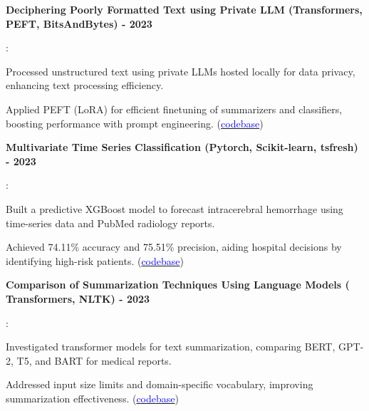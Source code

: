 \documentclass[letterpaper,10.5pt]{article}
\newcommand{\resumeItem}[2]{
  \item\small{
    \textbf{#1}{: #2 \vspace{-1pt}} %
  }
}
\newcommand{\resumeSubItem}[2]{\resumeItem{#1}{#2}\vspace{-1pt}} %
\begin{document}
    \resumeSubItem{Deciphering Poorly Formatted Text using Private LLM (Transformers, PEFT, BitsAndBytes) - 2023}{
\item \textbullet \quad Processed unstructured text using private LLMs hosted locally for data privacy, enhancing text processing efficiency. 

\textbullet \quad Applied PEFT (LoRA) for efficient finetuning of summarizers and classifiers, boosting performance with prompt engineering. (\href{https://github.com/thechashi/private_llm}{\textcolor{blue}{codebase}})




}



    \resumeSubItem{Multivariate Time Series Classification (Pytorch, Scikit-learn, tsfresh) - 2023}{
\item \textbullet \quad Built a predictive XGBoost model to forecast intracerebral hemorrhage using time-series data and PubMed radiology reports.

\textbullet \quad Achieved 74.11\% accuracy and 75.51\% precision, aiding hospital decisions by identifying high-risk patients. (\href{https://github.com/thechashi/medical_multivariate_timeseries}{\textcolor{blue}{codebase}})}
    
    \resumeSubItem{Comparison of Summarization Techniques Using Language Models ( Transformers, NLTK) - 2023}{
\item \textbullet \quad Investigated transformer models for text summarization, comparing BERT, GPT-2, T5, and BART for medical reports.

\textbullet \quad Addressed input size limits and domain-specific vocabulary, improving summarization effectiveness. (\href{https://github.com/thechashi/Data-Science-Graduate-Projects/tree/main}{\textcolor{blue}{codebase}})}

\end{document}
